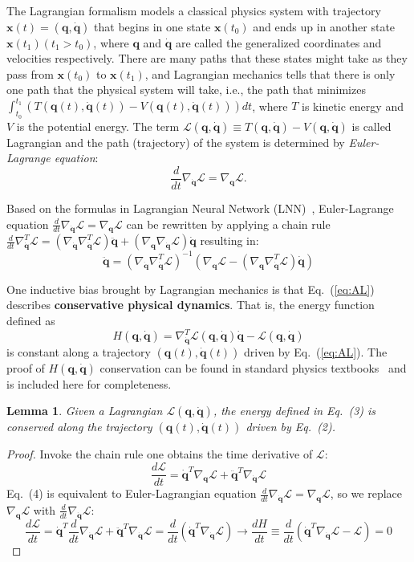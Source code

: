 \documentclass[aps,pre,reprint,superscriptaddress,nofootinbib,amsmath,amssymb]{revtex4-2}
\newcommand{\mat}[1]{\mathbf{#1}}
\newcommand{\x}{\mat{x}}
\newcommand{\q}{\mat{q}}
\newcommand{\qd}{\dot{\mat{q}}}
\newcommand{\qdd}{\ddot{\mat{q}}}
\newcommand{\lag}{\mathcal{L}}
\newtheorem{lemma}{Lemma}
\begin{document}
The Lagrangian formalism models a classical physics system with trajectory $\x(t)=(\q,\qd)$ that begins in one state $\x(t_0)$ and ends up in another state $\x(t_1) (t_1>t_0)$, where $\q$ and $\qd$ are called the generalized coordinates and velocities respectively. There are many paths that these states might take as they pass from $\x(t_0)$ to $\x(t_1)$, and Lagrangian mechanics tells that there is only one path that the physical system will take, i.e., the path that minimizes $\int_{t_0}^{t_1}(T(\q(t),\qd(t))-V(\q(t),\qd(t)))dt$, where $T$ is kinetic energy and $V$ is the potential energy. The term $\lag(\q,\qd)\equiv T(\q,\qd)-V(\q,\qd)$ is called Lagrangian and the path (trajectory) of the system is determined by \textit{Euler-Lagrange equation}:
	$$\frac{d}{dt}\nabla_{\qd} \lag=\nabla_{\q}\lag.$$

Based on the formulas in Lagrangian Neural Network (LNN)~\cite{cranmer2020lagrangian}, Euler-Lagrange equation $\frac{d}{dt}\nabla_{\qd} \lag=\nabla_{\q}\lag$ can be rewritten by {applying} a chain rule $\frac{d}{dt}\nabla_{\qd}^T\lag=(\nabla_{\qd}\nabla_{\qd}^T\lag)\qdd +(\nabla_{\q}\nabla_{\qd}\lag)\qd$ resulting in:
\begin{equation}
	\qdd = (\nabla_{\qd} \nabla_{\qd}^T\lag)^{-1}(\nabla_{\q}\lag-(\nabla_{\q}\nabla_{\qd}^T\lag)\qd)
\end{equation}

One inductive bias brought by Lagrangian mechanics is that Eq.~(\ref{eq:AL}) describes \textbf{conservative physical dynamics}. That is, the energy function defined as
\begin{equation}
\label{eq: definition_H}
	H(\q,\qd) = \nabla_{\qd}^T\lag(\q,\qd)\qd-\lag(\q,\qd)
\end{equation}
is constant along a trajectory $(\q(t),\qd(t))$ driven by Eq.~(\ref{eq:AL}). The proof of $H(\q,\qd)$ conservation can be found in standard physics textbooks~\cite{goldstein2002classical} and is included here for completeness.

\begin{lemma}\label{lemma:lag2conserve}
	Given a Lagrangian $\lag(\q,\qd)$, the energy defined in Eq.~(3) is conserved along the trajectory $(\q(t),\qd(t))$ driven by Eq.~(2).
\end{lemma}
\begin{proof}
	Invoke the chain rule one obtains the time derivative of $\lag$:
	\begin{equation}
		\frac{d\lag}{dt}=\qd^T\nabla_{\q}\lag+\qdd^T\nabla_{\qd}\lag
	\end{equation}
	Eq.~(4) is equivalent to Euler-Lagrangian equation $\frac{d}{dt}\nabla_{\qd}\lag=\nabla_{\q}\lag$, so we replace $\nabla_{\q}\lag$ with $\frac{d}{dt}\nabla_{\qd}\lag$:
	\begin{equation}
		\frac{d\lag}{dt}=\qd^T\frac{d}{dt}\nabla_{\qd}\lag+\qdd^T\nabla_{\qd}\lag=\frac{d}{dt}(\qd^T\nabla_{\qd}\lag)\longrightarrow \frac{dH}{dt}\equiv \frac{d}{dt}(\qd^T\nabla_{\qd}\lag-\lag)=0
	\end{equation}
\end{proof}
\end{document}
